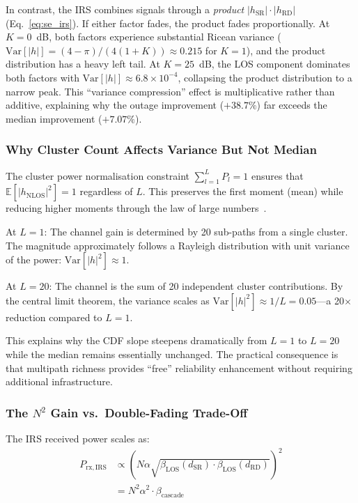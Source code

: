 \documentclass[journal]{IEEEtran} %
\begin{document}
In contrast, the IRS combines signals through a \textit{product} $|h_{\mathrm{SR}}| \cdot |h_{\mathrm{RD}}|$ (Eq.~\eqref{eq:se_irs}). If either factor fades, the product fades proportionally. At $K = 0$~dB, both factors experience substantial Ricean variance ($\mathrm{Var}[|h|] = (4-\pi)/(4(1+K)) \approx 0.215$ for $K = 1$), and the product distribution has a heavy left tail. At $K = 25$~dB, the LOS component dominates both factors with $\mathrm{Var}[|h|] \approx 6.8 \times 10^{-4}$, collapsing the product distribution to a narrow peak. This ``variance compression'' effect is multiplicative rather than additive, explaining why the outage improvement ($+38.7\%$) far exceeds the median improvement ($+7.07\%$).

\subsubsection{Why Cluster Count Affects Variance But Not Median}

The cluster power normalisation constraint $\sum_{l=1}^{L} P_l = 1$ ensures that $\mathbb{E}[|h_{\mathrm{NLOS}}|^2] = 1$ regardless of $L$. This preserves the first moment (mean) while reducing higher moments through the law of large numbers~\cite{tse2005fundamentals}.

At $L = 1$: The channel gain is determined by 20 sub-paths from a single cluster. The magnitude approximately follows a Rayleigh distribution with unit variance of the power: $\mathrm{Var}[|h|^2] \approx 1$.

At $L = 20$: The channel is the sum of 20 independent cluster contributions. By the central limit theorem, the variance scales as $\mathrm{Var}[|h|^2] \approx 1/L = 0.05$---a 20$\times$ reduction compared to $L = 1$.

This explains why the CDF slope steepens dramatically from $L = 1$ to $L = 20$ while the median remains essentially unchanged. The practical consequence is that multipath richness provides ``free'' reliability enhancement without requiring additional infrastructure.

\subsubsection{The $N^2$ Gain vs.\ Double-Fading Trade-Off}

The IRS received power scales as:
\begin{align}
P_{\mathrm{rx,IRS}}
&\propto
\left(
N\alpha
\sqrt{
\beta_{\mathrm{LOS}}(d_{\mathrm{SR}})
\cdot
\beta_{\mathrm{LOS}}(d_{\mathrm{RD}})
}
\right)^2
\nonumber\\
&=
N^2\alpha^2 \cdot \beta_{\mathrm{cascade}}
\label{eq:power_tradeoff}
\end{align}
\end{document}
